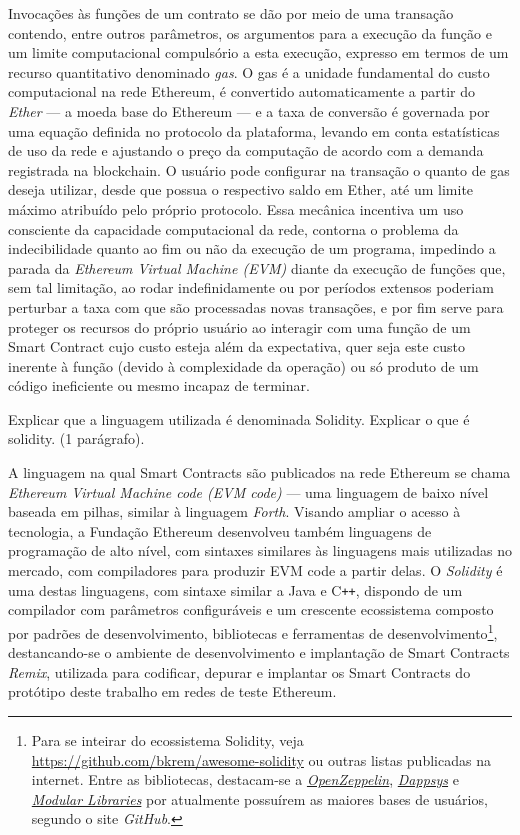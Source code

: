 \documentclass[a4paper,11pt]{article}
\begin{document}
Invocações às funções de um contrato se dão por meio de uma transação contendo, entre outros parâmetros, os argumentos para a execução da função e um limite computacional compulsório a esta execução, expresso em termos de um recurso quantitativo denominado \emph{gas}.
O gas é a unidade fundamental do custo computacional na rede Ethereum, é convertido automaticamente a partir do \emph{Ether} --- a moeda base do Ethereum --- e a taxa de conversão é governada por uma equação definida no protocolo da plataforma, levando em conta estatísticas de uso da rede e ajustando o preço da computação de acordo com a demanda registrada na blockchain.
O usuário pode configurar na transação o quanto de gas deseja utilizar, desde que possua o respectivo saldo em Ether, até um limite máximo atribuído pelo próprio protocolo.
Essa mecânica incentiva um uso consciente da capacidade computacional da rede, contorna o problema da indecibilidade quanto ao fim ou não da execução de um programa, impedindo a parada da \emph{Ethereum Virtual Machine (EVM)} diante da execução de funções que, sem tal limitação, ao rodar indefinidamente ou por períodos extensos poderiam perturbar a taxa com que são processadas novas transações, e por fim serve para proteger os recursos do próprio usuário ao interagir com uma função de um Smart Contract cujo custo esteja além da expectativa, quer seja este custo inerente à função (devido à complexidade da operação) ou só produto de um código ineficiente ou mesmo incapaz de terminar.

{\color{ForestGreen}Explicar que a linguagem utilizada é denominada Solidity. Explicar o que é solidity. (1 parágrafo).}

A linguagem na qual Smart Contracts são publicados na rede Ethereum se chama \emph{Ethereum Virtual Machine code (EVM code)} --- uma linguagem de baixo nível baseada em pilhas, similar à linguagem \emph{Forth}.
Visando ampliar o acesso à tecnologia, a Fundação Ethereum desenvolveu também linguagens de programação de alto nível, com sintaxes similares às linguagens mais utilizadas no mercado, com compiladores para produzir EVM code a partir delas. O \emph{Solidity} é uma destas linguagens, com sintaxe similar a Java e C\texttt{++}, dispondo de um compilador com parâmetros configuráveis e um crescente ecossistema composto por padrões de desenvolvimento, bibliotecas e ferramentas de desenvolvimento\footnote{Para se inteirar do ecossistema Solidity, veja \href{https://github.com/bkrem/awesome-solidity}{https://github.com/bkrem/awesome-solidity} ou outras listas publicadas na internet. Entre as bibliotecas, destacam-se a \emph{\href{https://openzeppelin.com/}{OpenZeppelin}}, \emph{\href{https://github.com/dapphub/dappsys}{Dappsys}} e \emph{\href{https://github.com/modular-network/ethereum-libraries}{Modular Libraries}} por atualmente possuírem as maiores bases de usuários, segundo o site \emph{GitHub}.}, destancando-se o ambiente de desenvolvimento e implantação de Smart Contracts \emph{Remix}, utilizada para codificar, depurar e implantar os Smart Contracts do protótipo deste trabalho em redes de teste Ethereum.
\end{document}
